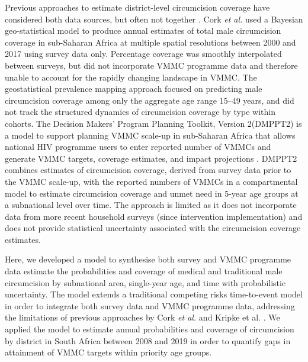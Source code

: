\documentclass{article}
\begin{document}
Previous approaches to estimate district-level circumcision coverage have considered both data sources, but often not together \autocite{cork2020mapping, kripke2016age, kripke2016cost}. Cork \textit{et al.} used a Bayesian geo-statistical model to produce annual estimates of total male circumcision coverage in sub-Saharan Africa at multiple spatial resolutions between 2000 and 2017 \autocite{cork2020mapping} using survey data only. Percentage coverage was smoothly interpolated between surveys, but did not incorporate VMMC programme data and therefore unable to account for the rapidly changing landscape in VMMC. The geostatistical prevalence mapping approach focused on predicting male circumcision coverage among only the aggregate age range 15--49 years, and did not track the structured dynamics of circumcision coverage by type within cohorts. The Decision Makers' Program Planning Toolkit, Version 2(DMPPT2) is a model to support planning VMMC scale-up in sub-Saharan Africa that allows national HIV programme users to enter reported number of VMMCs and generate VMMC targets, coverage estimates, and impact projections \autocite{kripke2016age, kripke2016cost}. DMPPT2 combines estimates of circumcision coverage, derived from survey data prior to the VMMC scale-up, with the reported numbers of VMMCs in a compartmental model to estimate circumcision coverage and unmet need in 5-year age groups at a subnational level over time. The approach is limited as it does not incorporate data from more recent household surveys (since intervention implementation) and does not provide statistical uncertainty associated with the circumcision coverage estimates.

Here, we developed a model to synthesise both survey and VMMC programme data estimate the probabilities and coverage of medical and traditional male circumcision by subnational area, single-year age, and time with probabilistic uncertainty. The model extends a traditional competing risks time-to-event model in order to integrate both survey data and VMMC programme data, addressing the limitations of previous approaches by Cork \textit{et al.} \autocite{cork2020mapping} and Kripke et al. \autocite{kripke2016age}. We applied the model to estimate annual probabilities and coverage of circumcision by district in South Africa between 2008 and 2019 in order to quantify gaps in attainment of VMMC targets within priority age groups.

\end{document}
